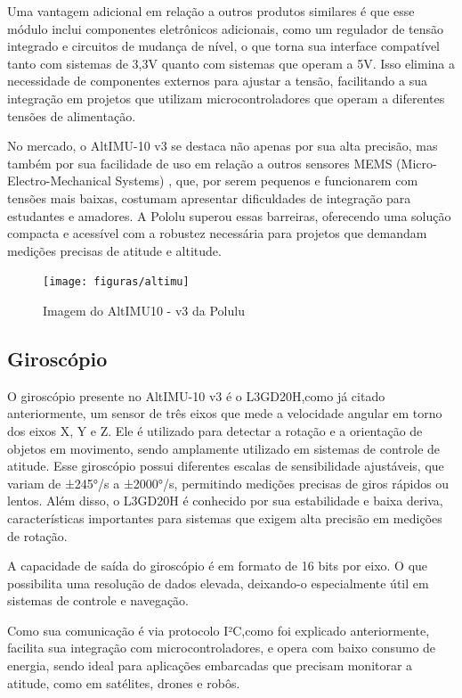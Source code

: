 \documentclass[
	12pt,				%
	openright,			%
	oneside,			%
	a4paper,			%
	english,			%
	brazil				%
	]{abntex2}
\begin{document}
Uma vantagem adicional em relação a outros produtos similares é que esse módulo inclui componentes eletrônicos adicionais, como um regulador de tensão integrado e circuitos de mudança de nível, o que torna sua interface compatível tanto com sistemas de 3,3V quanto com sistemas que operam a 5V. Isso elimina a necessidade de componentes externos para ajustar a tensão, facilitando a sua integração em projetos que utilizam microcontroladores que operam a diferentes tensões de alimentação.

No mercado, o AltIMU-10 v3 se destaca não apenas por sua alta precisão, mas também por sua facilidade de uso em relação a outros sensores MEMS (Micro-Electro-Mechanical Systems) , que, por serem pequenos e funcionarem com tensões mais baixas, costumam apresentar dificuldades de integração para estudantes e amadores. A Pololu superou essas barreiras, oferecendo uma solução compacta e acessível com a robustez necessária para projetos que demandam medições precisas de atitude e altitude. \cite{Polulu2024}

\begin{figure}[h]
	\centering
	\texttt{[image: figuras/altimu]}
	\caption[AltIMU10 - v3]{Imagem do AltIMU10 - v3 da Polulu}
	\label{fig:altimu}
\end{figure}


\subsection{Giroscópio}
O giroscópio presente no AltIMU-10 v3 é o L3GD20H,como já citado anteriormente, um sensor de três eixos que mede a velocidade angular em torno dos eixos X, Y e Z. Ele é utilizado para detectar a rotação e a orientação de objetos em movimento, sendo amplamente utilizado em sistemas de controle de atitude. Esse giroscópio possui diferentes escalas de sensibilidade ajustáveis, que variam de ±245°/s a ±2000°/s, permitindo medições precisas de giros rápidos ou lentos. Além disso, o L3GD20H é conhecido por sua estabilidade e baixa deriva, características importantes para sistemas que exigem alta precisão em medições de rotação. 

A capacidade de saída do giroscópio é em formato de 16 bits por eixo. O que possibilita uma resolução de dados elevada, deixando-o especialmente útil em sistemas de controle e navegação.

Como sua comunicação é via protocolo I²C,como foi explicado anteriormente, facilita sua integração com microcontroladores, e opera com baixo consumo de energia, sendo ideal para aplicações embarcadas que precisam monitorar a atitude, como em satélites, drones e robôs.
\end{document}
